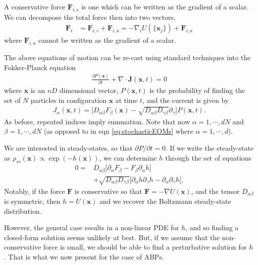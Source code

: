 \documentclass[twocolumn,amsmath,amssymb,aps]{revtex4-1}%
\begin{document}
A conservative force $\bm{F}_{i,c}$ is one which can be written as the gradient
of a scalar. We can decompose the total force then into two vectors,
\begin{align}
  \bm{F}_{i}
  & = \bm{F}_{i,c}+\bm{F}_{i,a} = -\nabla_{i}U(\{\bm{x}_j\}) + \bm{F}_{i,a}
\end{align}
where $\bm{F}_{i,a}$ cannot be written as the gradient of a scalar.

The above equations of motion can be re-cast using standard techniques into
the Fokker-Planck equation
\begin{align}
  \frac{\partial P(\bm{x})}{\partial t} + \nabla\cdot\bm{J}(\bm{x},t)
  = 0
\end{align}
where $\bm{x}$ is an $nD$ dimensional vector, $P(\bm{x},t)$ is the
probability of finding the set of $N$ particles in configuration $\bm{x}$
at time $t$, and the current is given by
\begin{align}
  J_{\alpha}(\bm{x},t)
  = \bigg[D_{\alpha\beta}F_{\beta}(\bm{x})
    -\sqrt{D_{\alpha\beta}D_{\gamma\beta}}
    \partial_{\gamma}\bigg]P(\bm{x},t).
\end{align}
As before, repeated indices imply summation.
Note that now $\alpha=1,\cdots,dN$ and $\beta=1,\cdots,dN$ (as opposed to
in eqn \ref{eq:stochasticEOMs} where $\alpha=1,\cdots,d$).

We are interested in steady-states, so that $\partial P/\partial t=0$.
If we write the steady-state as $\rho_{ss}(\bm{x})\propto \exp(-h(\bm{x}))$,
we can determine $h$ through the set of equations
\begin{align}\label{eq:generic_ss}
  0
  =&D_{\alpha\beta}\big[\partial_{\alpha}F_{\beta}
    -F_{\beta}\partial_{\alpha}h\big]\nonumber\\
  &+\sqrt{D_{\alpha\beta}D_{\gamma\beta}}
    \big[\partial_{\alpha}h\partial_{\gamma}h
      -\partial_{\alpha}\partial_{\gamma}h\big].
\end{align}
Notably, if the force $\bm{F}$ is conservative so that
$\bm{F}=-\nabla U(\bm{x})$, and the tensor $D_{\alpha\beta}$ is symmetric,
then $h=U(\bm{x})$ and we recover the Boltzmann steady-state distribution.

However, the general case results in a non-linear PDE for $h$,
and so finding a closed-form solution seems unlikely at best. But, if
we assume that the non-conservative force is small, we should be able
to find a perturbative solution for $h$. That is what we now present for
the case of ABPs.
\end{document}
